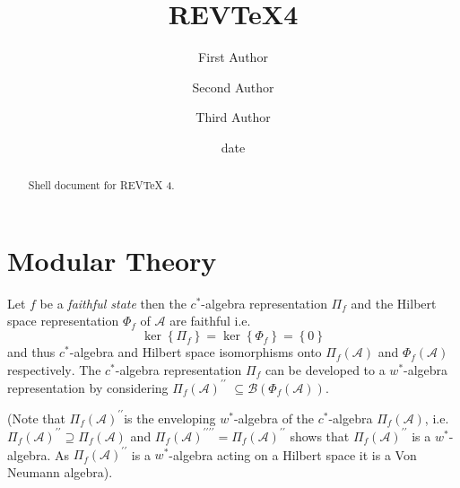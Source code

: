 \documentclass[aps,preprint]{revtex4}%
\begin{document}
\title[Short title for running header]{REV\TeX4}
\author{First Author}
\author{Second Author}
\author{Third Author}

\begin{abstract}
Shell document for REV\TeX{} 4.

\end{abstract}
\date[Date text]{date}




\maketitle
\tableofcontents


\section{Modular Theory}



Let $f$ be a \emph{faithful state} then the $c^{\ast}$-algebra representation
$\Pi_{f}$ and the Hilbert space representation $\Phi_{f}$ of $\mathcal{A}$ are
faithful i.e.
\begin{equation}
\ker\left\{  \Pi_{f}\right\}  =\ker\left\{  \Phi_{f}\right\}  =\left\{
0\right\}
\end{equation}
and thus $c^{\ast}$-algebra and Hilbert space isomorphisms onto $\Pi
_{f}\left(  \mathcal{A}\right)  $ and $\Phi_{f}\left(  \mathcal{A}\right)  $
respectively$.$ The $c^{\ast}$-algebra representation $\Pi_{f}$ can be
developed to a $w^{\ast}$-algebra representation by considering $\Pi
_{f}\left(  \mathcal{A}\right)  ^{\prime\prime}$ $\subseteq\mathcal{B}\left(
\Phi_{f}\left(  \mathcal{A}\right)  \right)  .$

(Note that $\Pi_{f}\left(  \mathcal{A}\right)  ^{\prime\prime}$is the
enveloping $w^{\ast}$-algebra of the $c^{\ast}$-algebra $\Pi_{f}\left(
\mathcal{A}\right)  $, i.e. $\Pi_{f}\left(  \mathcal{A}\right)  ^{\prime
\prime}\supseteq\Pi_{f}\left(  \mathcal{A}\right)  $ and $\Pi_{f}\left(
\mathcal{A}\right)  ^{\prime\prime\prime\prime}=\Pi_{f}\left(  \mathcal{A}%
\right)  ^{\prime\prime}$ shows that $\Pi_{f}\left(  \mathcal{A}\right)
^{\prime\prime}$ is a $w^{\ast}$-algebra. As $\Pi_{f}\left(  \mathcal{A}%
\right)  ^{\prime\prime}$ is a $w^{\ast}$-algebra acting on a Hilbert space it
is a Von Neumann algebra).
\end{document}
